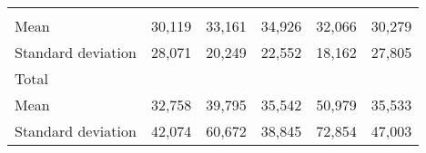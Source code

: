 \begin{tabular}{llllll}
  \multicolumn{1}{|r}{} &
  \multicolumn{1}{r}{} &
  \multicolumn{1}{r}{} &
  \multicolumn{1}{r}{} &
  \multicolumn{1}{r}{} \\
\multicolumn{1}{l}{\hspace{4em}Mean} &
  \multicolumn{1}{|r}{30,119} &
  \multicolumn{1}{r}{33,161} &
  \multicolumn{1}{r}{34,926} &
  \multicolumn{1}{r}{32,066} &
  \multicolumn{1}{r}{30,279} \\
\multicolumn{1}{l}{\hspace{4em}Standard deviation} &
  \multicolumn{1}{|r}{28,071} &
  \multicolumn{1}{r}{20,249} &
  \multicolumn{1}{r}{22,552} &
  \multicolumn{1}{r}{18,162} &
  \multicolumn{1}{r}{27,805} \\
\multicolumn{1}{l}{\hspace{3em}Total} &
  \multicolumn{1}{|r}{} &
  \multicolumn{1}{r}{} &
  \multicolumn{1}{r}{} &
  \multicolumn{1}{r}{} &
  \multicolumn{1}{r}{} \\
\multicolumn{1}{l}{\hspace{4em}Mean} &
  \multicolumn{1}{|r}{32,758} &
  \multicolumn{1}{r}{39,795} &
  \multicolumn{1}{r}{35,542} &
  \multicolumn{1}{r}{50,979} &
  \multicolumn{1}{r}{35,533} \\
\multicolumn{1}{l}{\hspace{4em}Standard deviation} &
  \multicolumn{1}{|r}{42,074} &
  \multicolumn{1}{r}{60,672} &
  \multicolumn{1}{r}{38,845} &
  \multicolumn{1}{r}{72,854} &
  \multicolumn{1}{r}{47,003} \\
\cline{1-6}
\end{tabular}

